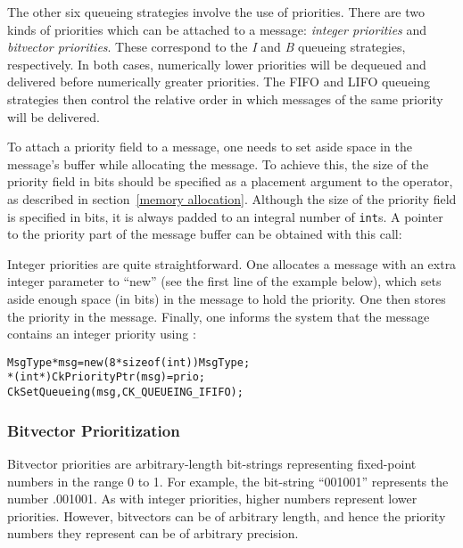 The other six queueing strategies involve the use of
priorities.  There are two kinds of priorities which can be
attached to a message: \emph{integer priorities} and
\emph{bitvector priorities}. These correspond to
the \emph{I} and \emph{B} queueing strategies, respectively. In both cases,
numerically lower priorities will be dequeued and delivered before numerically
greater priorities. The FIFO and LIFO queueing strategies then control the
relative order in which messages of the same priority will be delivered.

To attach a priority field to a message, one needs to set aside space in the
message's buffer while allocating the message.  To
achieve this, the size of the priority field in bits
should be specified as a placement argument to the  operator, as
described in section~\ref{memory allocation}.  Although the size of the
priority field is specified in bits, it is always padded to an integral number
of {\tt int}s.  A pointer to the priority part of the message buffer can be
obtained with this call:\\


Integer priorities are quite straightforward.  One allocates a message
with an extra integer parameter to ``new'' (see the first line of the
example below), which sets aside enough space (in bits) in the message
to hold the priority.  One then stores the priority in the message.
Finally, one informs the system that the message contains an integer
priority using :

\begin{alltt}
  MsgType *msg = new (8*sizeof(int)) MsgType;
  *(int*)CkPriorityPtr(msg) = prio;
  CkSetQueueing(msg, CK_QUEUEING_IFIFO);
\end{alltt}

\subsubsection{Bitvector Prioritization}

Bitvector priorities are arbitrary-length bit-strings representing fixed-point
numbers in the range 0 to 1.  For example, the bit-string ``001001'' represents
the number .001001\raisebox{-.5ex}{\scriptsize binary}.  As with integer
priorities, higher numbers represent lower priorities.  However, bitvectors can
be of arbitrary length, and hence the priority numbers they represent can be
of arbitrary precision.

